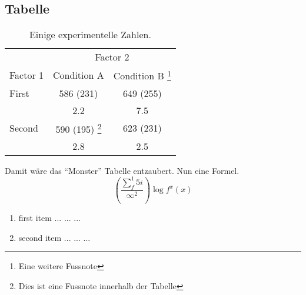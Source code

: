 \citeauthor{pintrich_motivational_1990}

\citeyear[p. 2]{alshammari_meta-analysis_2013}

\citeauthor{ziegler_hochbegabung_2008} \citeyear{ziegler_hochbegabung_2008}

\subsection{Tabelle}
\begin{table}[htb]
\begin{minipage}{\linewidth}
\renewcommand{\footnoterule}{}
\renewcommand{\thefootnote}{\alph{footnote}}
\caption{Einige experimentelle Zahlen.}
\label{tab:tab1}
\centering
\begin{tabular}{lcc}
\toprule
          & \multicolumn{2}{c}{Factor 2} \\ 
          	\cmidrule{2-3}
Factor 1  & Condition A  & Condition B \footnote{Eine weitere Fussnote}  \\ 
\midrule
First     & 586 (231)    & 649 (255)     \\
          &    2.2       &    7.5        \\
Second    & 590 (195) \footnote{Dies ist eine Fussnote innerhalb der Tabelle}   & 623 (231)     \\
          &    2.8       &    2.5        \\ 
\bottomrule
\end{tabular}
\end{minipage}
\end{table}
Damit wäre das \enquote{Monster} Tabelle entzaubert.
Nun eine Formel.
\begin{equation}
\left( \frac { \sum _{ f }^{ 1 }{ 5i }  }{ { \infty  }^{ 2 } }  \right) \log { f^{ x }\left( x \right)  } 
\label{eq:Equ01}
\end{equation}

\begin{enumerate}
	 \item first item ... ... ...
     \item second item ... ... ...
\end{enumerate}

